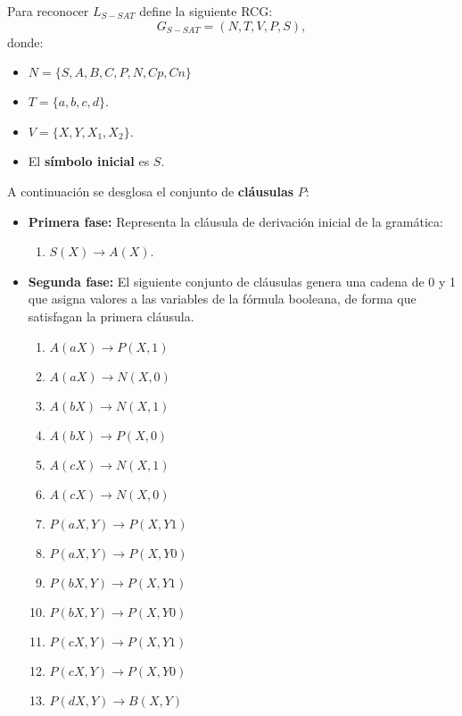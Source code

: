 \documentclass[12pt]{article}
\begin{document}
Para reconocer $L_{S-SAT}$ define la siguiente RCG:
\[
    G_{S-SAT} = (N, T, V, P, S),
\]
donde:

\begin{itemize}
    \item $N=\{S,A,B,C,P,N,Cp,Cn\}$
    \item $T=\{a,b,c,d\}$.
    \item $V=\{X,Y,X_1,X_2\}$.
    \item El \textbf{símbolo inicial} es $S$.
\end{itemize}

A continuación se desglosa el conjunto de \textbf{cláusulas} $P$:

\begin{itemize}
    \item \textbf{Primera fase:} Representa la cláusula de derivación inicial de la gramática:
          \begin{enumerate}
              \item $S(X)\to A(X)$.
          \end{enumerate}

    \item \textbf{Segunda fase:} El siguiente conjunto de cláusulas genera una cadena de 0 y 1 que asigna valores a las
          variables de la fórmula booleana, de forma que satisfagan la primera cláusula.
          \begin{multicols}{2}
              \begin{enumerate}[start=2]
                  \item $A(aX)\to P(X,1)$
                  \item $A(aX)\to N(X,0)$
                  \item $A(bX)\to N(X,1)$
                  \item $A(bX)\to P(X,0)$
                  \item $A(cX)\to N(X,1)$
                  \item $A(cX)\to N(X,0)$

                  \item $P(aX,Y)\to P(X,Y1)$
                  \item $P(aX,Y)\to P(X,Y0)$
                  \item $P(bX,Y)\to P(X,Y1)$
                  \item $P(bX,Y)\to P(X,Y0)$
                  \item $P(cX,Y)\to P(X,Y1)$
                  \item $P(cX,Y)\to P(X,Y0)$
                  \item $P(dX,Y)\to B(X,Y)$


\end{enumerate}
\end{multicols}
\end{itemize}
\end{document}
